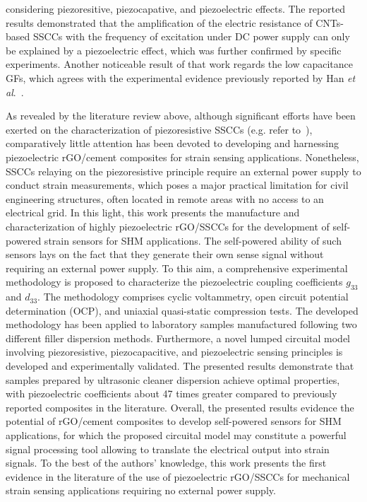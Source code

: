 \documentclass[a4paper,fleqn]{cas-sc}
\begin{document}
\cite{DaAlessandro2014} considering piezoresitive, piezocapative, and piezoelectric effects. The reported results demonstrated that the amplification of the electric resistance of CNTs-based SSCCs with the frequency of excitation under DC power supply can only be explained by a piezoelectric effect, which was further confirmed by specific experiments. Another noticeable result of that work regards the low capacitance GFs, which agrees with the experimental evidence previously reported by Han \textit{et al}.~\cite{Han2012}.

As revealed by the literature review above, although significant efforts have been exerted on the characterization of piezoresistive SSCCs (e.g. refer to~\cite{DONG2021100563,QI2023130340}), comparatively little attention has been devoted to developing and harnessing piezoelectric rGO/cement composites for strain sensing applications. Nonetheless, SSCCs relaying on the piezoresistive principle require an external power supply to conduct strain measurements, which poses a major practical limitation for civil engineering structures, often located in remote areas with no access to an electrical grid. In this light, this work presents the manufacture and characterization of highly piezoelectric rGO/SSCCs for the development of self-powered strain sensors for SHM applications. The self-powered ability of such sensors lays on the fact that they generate their own sense signal without requiring an external power supply. To this aim, a comprehensive experimental methodology is proposed to characterize the piezoelectric coupling coefficients $g_{33}$ and $d_{33}$. The methodology comprises cyclic voltammetry, open circuit potential determination (OCP), and uniaxial quasi-static compression tests. The developed methodology has been applied to laboratory samples manufactured following two different filler dispersion methods. Furthermore, a novel lumped circuital model involving piezoresistive, piezocapacitive, and piezoelectric sensing principles is developed and experimentally validated. The presented results demonstrate that samples prepared by ultrasonic cleaner dispersion achieve optimal properties, with piezoelectric coefficients about 47 times greater compared to previously reported composites in the literature. Overall, the presented results evidence the potential of rGO/cement composites to develop self-powered sensors for SHM applications, for which the proposed circuital model may constitute a powerful signal processing tool allowing to translate the electrical output into strain signals. To the best of the authors' knowledge, this work presents the first evidence in the literature of the use of piezoelectric rGO/SSCCs for mechanical strain sensing applications requiring no external power supply.
\end{document}
